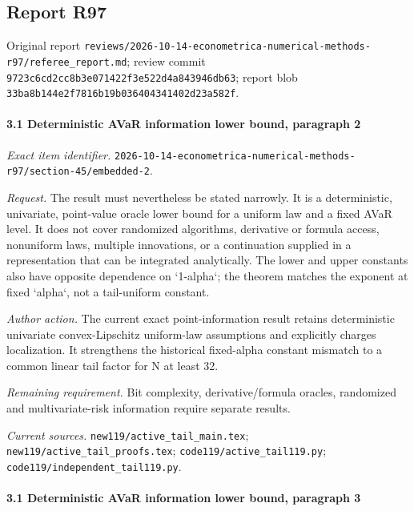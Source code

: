 \subsection{Report R97}

Original report \nolinkurl{reviews/2026-10-14-econometrica-numerical-methods-r97/referee_report.md}; review commit \nolinkurl{9723c6cd2cc8b3e071422f3e522d4a843946db63}; report blob \nolinkurl{33ba8b144e2f7816b19b036404341402d23a582f}.

\paragraph{3.1 Deterministic AVaR information lower bound, paragraph 2}

\emph{Exact item identifier.} \nolinkurl{2026-10-14-econometrica-numerical-methods-r97/section-45/embedded-2}.

\par\emph{Request.} The result must nevertheless be stated narrowly. It is a deterministic, univariate, point-value oracle lower bound for a uniform law and a fixed AVaR level. It does not cover randomized algorithms, derivative or formula access, nonuniform laws, multiple innovations, or a continuation supplied in a representation that can be integrated analytically. The lower and upper constants also have opposite dependence on `1-alpha`; the theorem matches the exponent at fixed `alpha`, not a tail-uniform constant.

\par\emph{Author action.} The current exact point-information result retains deterministic univariate convex-Lipschitz uniform-law assumptions and explicitly charges localization. It strengthens the historical fixed-alpha constant mismatch to a common linear tail factor for N at least 32.

\par\emph{Remaining requirement.} Bit complexity, derivative/\allowbreak{}formula oracles, randomized and multivariate-risk information require separate results.

\par\emph{Current sources.} \nolinkurl{new119/active_tail_main.tex}; \nolinkurl{new119/active_tail_proofs.tex}; \nolinkurl{code119/active_tail119.py}; \nolinkurl{code119/independent_tail119.py}.

\paragraph{3.1 Deterministic AVaR information lower bound, paragraph 3}

